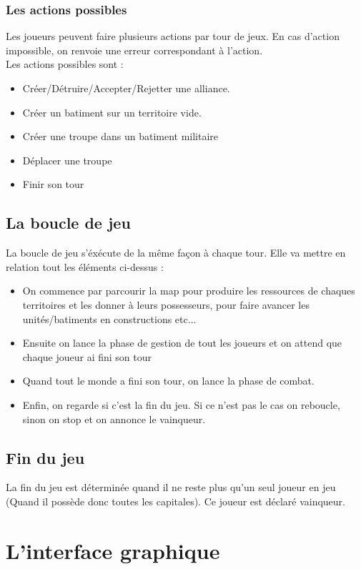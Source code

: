       
      \subsubsection{Les actions possibles}
	Les joueurs peuvent faire plusieurs actions par tour de jeux. En cas d'action impossible, on renvoie une erreur correspondant à l'action. \\
	Les actions possibles sont :
	\begin{itemize}
	 \item Créer/Détruire/Accepter/Rejetter une alliance.
	 \item Créer un batiment sur un territoire vide.
	 \item Créer une troupe dans un batiment militaire
	 \item Déplacer une troupe
	 \item Finir son tour
	\end{itemize}

  
    \subsection{La boucle de jeu}
      La boucle de jeu s'éxécute de la même façon à chaque tour. Elle va mettre en relation tout les éléments ci-dessus :
      \begin{itemize}
       \item On commence par parcourir la map pour produire les ressources de chaques territoires et les donner à leurs possesseurs, pour faire avancer les unités/batiments en constructions etc...
       \item Ensuite on lance la phase de gestion de tout les joueurs et on attend que chaque joueur ai fini son tour
       \item Quand tout le monde a fini son tour, on lance la phase de combat.
       \item Enfin, on regarde si c'est la fin du jeu. Si ce n'est pas le cas on reboucle, sinon on stop et on annonce le vainqueur.
      \end{itemize}
      
    \subsection{Fin du jeu}
      La fin du jeu est déterminée quand il ne reste plus qu'un seul joueur en jeu (Quand il possède donc toutes les capitales). Ce joueur est déclaré vainqueur.
  
  \section{L'interface graphique}
  
